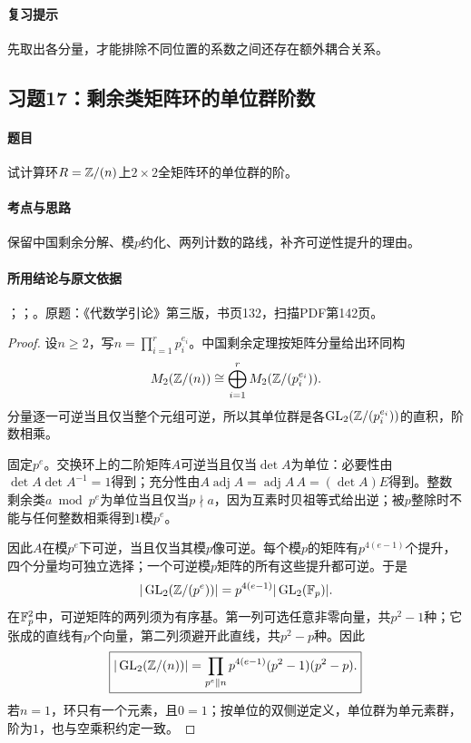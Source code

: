 \paragraph{复习提示}

先取出各分量，才能排除不同位置的系数之间还存在额外耦合关系。



\subsection{习题17：剩余类矩阵环的单位群阶数}

\label{ex:3:17}

\paragraph{题目}

试计算环$R=\mathbb Z/(n)$上$2\times2$全矩阵环的单位群的阶。

\paragraph{考点与思路}

保留中国剩余分解、模$p$约化、两列计数的路线，补齐可逆性提升的理由。

\paragraph{所用结论与原文依据}

；；。原题：《代数学引论》第三版，书页132，扫描PDF第142页。


\begin{proof}

设$n\ge2$，写$n=\prod_{i=1}^r p_i^{e_i}$。中国剩余定理按矩阵分量给出环同构
\[
M_2(\mathbb Z/(n))\cong\bigoplus\limits_{i=1}^r M_2(\mathbb Z/(p_i^{e_i})).
\]
分量逐一可逆当且仅当整个元组可逆，所以其单位群是各$\operatorname{GL}_2(\mathbb Z/(p_i^{e_i}))$的直积，阶数相乘。

固定$p^e$。交换环上的二阶矩阵$A$可逆当且仅当$\det A$为单位：必要性由$\det A\det A^{-1}=1$得到；充分性由$A\operatorname{adj}A=\operatorname{adj}A\,A=(\det A)E$得到。整数剩余类$a\bmod p^e$为单位当且仅当$p\nmid a$，因为互素时贝祖等式给出逆；被$p$整除时不能与任何整数相乘得到$1$模$p^e$。

因此$A$在模$p^e$下可逆，当且仅当其模$p$像可逆。每个模$p$的矩阵有$p^{4(e-1)}$个提升，四个分量均可独立选择；一个可逆模$p$矩阵的所有这些提升都可逆。于是
\[
|\operatorname{GL}_2(\mathbb Z/(p^e))|=p^{4(e-1)}|\operatorname{GL}_2(\mathbb F_p)|.
\]
在$\mathbb F_p^2$中，可逆矩阵的两列须为有序基。第一列可选任意非零向量，共$p^2-1$种；它张成的直线有$p$个向量，第二列须避开此直线，共$p^2-p$种。因此
\[
\boxed{|\operatorname{GL}_2(\mathbb Z/(n))|=\prod_{p^e\parallel n}p^{4(e-1)}(p^2-1)(p^2-p).}
\]
若$n=1$，环只有一个元素，且$0=1$；按单位的双侧逆定义，单位群为单元素群，阶为$1$，也与空乘积约定一致。

\end{proof}

